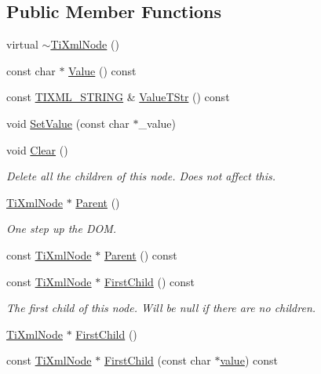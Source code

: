 \subsection*{Public Member Functions}
\begin{DoxyCompactItemize}
\item 
virtual \hyperlink{class_ti_xml_node_a027a76cccd359c831ee4024b58c49625}{$\sim$\+Ti\+Xml\+Node} ()
\item 
const char $\ast$ \hyperlink{class_ti_xml_node_a77943eb90d12c2892b1337a9f5918b41}{Value} () const 
\item 
const \hyperlink{tinyxml_8h_a92bada05fd84d9a0c9a5bbe53de26887}{T\+I\+X\+M\+L\+\_\+\+S\+T\+R\+I\+NG} \& \hyperlink{class_ti_xml_node_a83ece13d2ea66dac66e0b21332229239}{Value\+T\+Str} () const 
\item 
void \hyperlink{class_ti_xml_node_a2a38329ca5d3f28f98ce932b8299ae90}{Set\+Value} (const char $\ast$\+\_\+value)
\item 
void \hyperlink{class_ti_xml_node_a708e7f953df61d4d2d12f73171550a4b}{Clear} ()
\begin{DoxyCompactList}\small\item\em Delete all the children of this node. Does not affect \textquotesingle{}this\textquotesingle{}. \end{DoxyCompactList}\item 
\hyperlink{class_ti_xml_node}{Ti\+Xml\+Node} $\ast$ \hyperlink{class_ti_xml_node_ab643043132ffd794f8602685d34a982e}{Parent} ()
\begin{DoxyCompactList}\small\item\em One step up the D\+OM. \end{DoxyCompactList}\item 
const \hyperlink{class_ti_xml_node}{Ti\+Xml\+Node} $\ast$ \hyperlink{class_ti_xml_node_a78878709e53066f06eb4fcbcdd3a5260}{Parent} () const 
\item 
const \hyperlink{class_ti_xml_node}{Ti\+Xml\+Node} $\ast$ \hyperlink{class_ti_xml_node_a44c8eee26bbe2d1b2762038df9dde2f0}{First\+Child} () const 
\begin{DoxyCompactList}\small\item\em The first child of this node. Will be null if there are no children. \end{DoxyCompactList}\item 
\hyperlink{class_ti_xml_node}{Ti\+Xml\+Node} $\ast$ \hyperlink{class_ti_xml_node_a5e97d69b7c0ebd27fb7286be56559b77}{First\+Child} ()
\item 
const \hyperlink{class_ti_xml_node}{Ti\+Xml\+Node} $\ast$ \hyperlink{class_ti_xml_node_ab5f722624113c8203227de4f56576d31}{First\+Child} (const char $\ast$\hyperlink{class_ti_xml_node_aead528b3cedc33c16a6c539872c7cc8b}{value}) const 

\end{DoxyCompactItemize}
